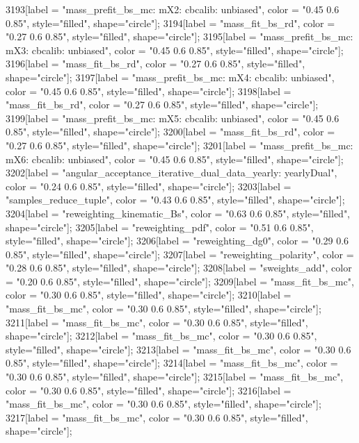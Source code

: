 {	3193[label = "mass_prefit_bs_mc\nmassbin: mX2\nmassmodel: cbcalib\ntrigger: unbiased", color = "0.45 0.6 0.85", style="filled", shape="circle"];
	3194[label = "mass_fit_bs_rd", color = "0.27 0.6 0.85", style="filled", shape="circle"];
	3195[label = "mass_prefit_bs_mc\nmassbin: mX3\nmassmodel: cbcalib\ntrigger: unbiased", color = "0.45 0.6 0.85", style="filled", shape="circle"];
	3196[label = "mass_fit_bs_rd", color = "0.27 0.6 0.85", style="filled", shape="circle"];
	3197[label = "mass_prefit_bs_mc\nmassbin: mX4\nmassmodel: cbcalib\ntrigger: unbiased", color = "0.45 0.6 0.85", style="filled", shape="circle"];
	3198[label = "mass_fit_bs_rd", color = "0.27 0.6 0.85", style="filled", shape="circle"];
	3199[label = "mass_prefit_bs_mc\nmassbin: mX5\nmassmodel: cbcalib\ntrigger: unbiased", color = "0.45 0.6 0.85", style="filled", shape="circle"];
	3200[label = "mass_fit_bs_rd", color = "0.27 0.6 0.85", style="filled", shape="circle"];
	3201[label = "mass_prefit_bs_mc\nmassbin: mX6\nmassmodel: cbcalib\ntrigger: unbiased", color = "0.45 0.6 0.85", style="filled", shape="circle"];
	3202[label = "angular_acceptance_iterative_dual_data_yearly\nangacc: yearlyDual", color = "0.24 0.6 0.85", style="filled", shape="circle"];
	3203[label = "samples_reduce_tuple", color = "0.43 0.6 0.85", style="filled", shape="circle"];
	3204[label = "reweighting_kinematic_Bs", color = "0.63 0.6 0.85", style="filled", shape="circle"];
	3205[label = "reweighting_pdf", color = "0.51 0.6 0.85", style="filled", shape="circle"];
	3206[label = "reweighting_dg0", color = "0.29 0.6 0.85", style="filled", shape="circle"];
	3207[label = "reweighting_polarity", color = "0.28 0.6 0.85", style="filled", shape="circle"];
	3208[label = "sweights_add", color = "0.20 0.6 0.85", style="filled", shape="circle"];
	3209[label = "mass_fit_bs_mc", color = "0.30 0.6 0.85", style="filled", shape="circle"];
	3210[label = "mass_fit_bs_mc", color = "0.30 0.6 0.85", style="filled", shape="circle"];
	3211[label = "mass_fit_bs_mc", color = "0.30 0.6 0.85", style="filled", shape="circle"];
	3212[label = "mass_fit_bs_mc", color = "0.30 0.6 0.85", style="filled", shape="circle"];
	3213[label = "mass_fit_bs_mc", color = "0.30 0.6 0.85", style="filled", shape="circle"];
	3214[label = "mass_fit_bs_mc", color = "0.30 0.6 0.85", style="filled", shape="circle"];
	3215[label = "mass_fit_bs_mc", color = "0.30 0.6 0.85", style="filled", shape="circle"];
	3216[label = "mass_fit_bs_mc", color = "0.30 0.6 0.85", style="filled", shape="circle"];
	3217[label = "mass_fit_bs_mc", color = "0.30 0.6 0.85", style="filled", shape="circle"];
}
